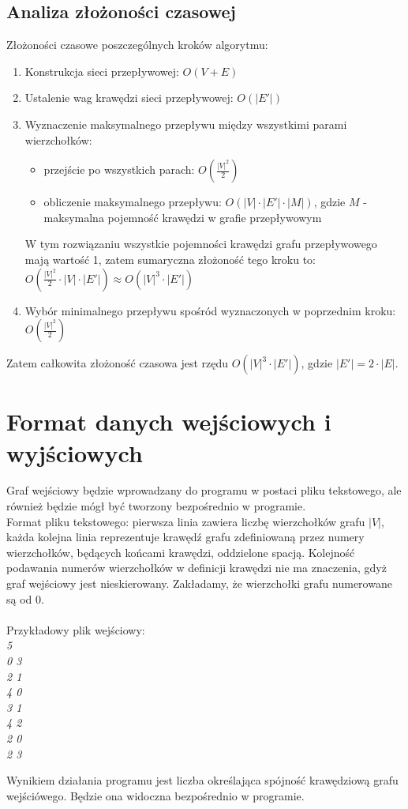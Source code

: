 \documentclass{article}
\begin{document}
\subsection{Analiza złożoności czasowej}


Złożoności czasowe poszczególnych kroków algorytmu: 
\begin{enumerate}
\item Konstrukcja sieci przepływowej: $O(V+E)$
\item Ustalenie wag krawędzi sieci przepływowej: $O(|E'|)$
\item Wyznaczenie maksymalnego przepływu między wszystkimi parami wierzchołków: 
\begin{itemize}
    \item przejście po wszystkich parach: $O(\frac{|V|^{2}}{2})$
    \item obliczenie maksymalnego przepływu: $O(|V|\cdot |E'|\cdot |M|)$, gdzie $M$ - maksymalna pojemność krawędzi w grafie przepływowym
\end{itemize}
W tym rozwiązaniu wszystkie pojemności krawędzi grafu przepływowego mają wartość 1, zatem sumaryczna złożoność tego kroku to: $O(\frac{|V|^{2}}{2}\cdot|V|\cdot |E'|) \approx O(|V|^{3}\cdot |E'|)$
\item Wybór minimalnego przepływu spośród wyznaczonych w poprzednim kroku: $O(\frac{|V|^{2}}{2})$
\end{enumerate}
Zatem całkowita złożoność czasowa jest rzędu $O(|V|^{3}\cdot |E'|)$, gdzie $|E'|=2\cdot |E|$.\\


\section{Format danych wejściowych i wyjściowych}
Graf wejściowy będzie wprowadzany do programu w postaci pliku tekstowego, ale również będzie mógł być tworzony bezpośrednio w programie.\\

Format pliku tekstowego: pierwsza linia zawiera liczbę wierzchołków grafu $|V|$, każda kolejna linia reprezentuje krawędź grafu zdefiniowaną przez numery wierzchołków, będących końcami krawędzi, oddzielone spacją. Kolejność podawania numerów wierzchołków w definicji krawędzi nie ma znaczenia, gdyż graf wejściowy jest nieskierowany. Zakładamy, że wierzchołki grafu numerowane są od 0.
\\\\
Przykładowy plik wejściowy:\\
\textit{5\\
0 3\\
2 1\\
4 0\\
3 1\\
4 2\\
2 0\\
2 3\\
}


Wynikiem działania programu jest liczba określająca spójność krawędziową grafu wejściówego. Będzie ona widoczna bezpośrednio w programie.
\end{document}
